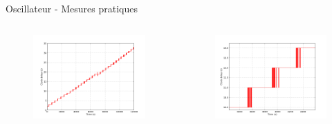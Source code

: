 \documentclass[handout]{beamer}
\begin{document}
\begin{frame}{Oscillateur - Mesures pratiques}
\begin{columns}
\begin{column}{0.5\textwidth}
	\begin{figure}
		\centering
		\includegraphics[width=\textwidth,height=0.9\textheight,keepaspectratio]{scale4_int.png}
	\end{figure}
\end{column}
\begin{column}{0.5\textwidth}
	\begin{figure}
		\centering
		\includegraphics[width=\textwidth,height=0.9\textheight,keepaspectratio]{scale2_int.png}
	\end{figure}
\end{column}
\end{columns}
\end{frame}
\end{document}
